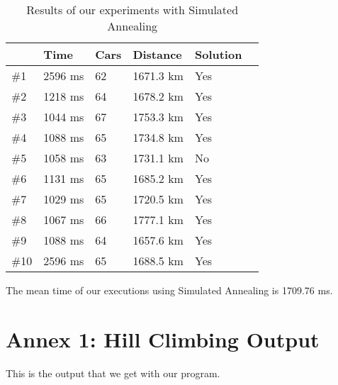 \documentclass[12]{article}
\begin{document}
\begin{table}[h]
\centering
\begin{tabular}{|l|l|l|l|l|l|}
\hline & \textbf{Time}  & \textbf{Cars} & \textbf{Distance} & \textbf{Solution}\\  \hline
 \#1 & 2596 ms  & 62 & 1671.3 km & Yes \\ \hline
 \#2 & 1218 ms & 64 & 1678.2 km & Yes \\ \hline
  \#3 & 1044 ms & 67 & 1753.3 km & Yes \\ \hline
 \#4 & 1088 ms & 65 & 1734.8 km & Yes \\ \hline
 \#5 & 1058 ms & 63 & 1731.1 km & No \\ \hline
 \#6 & 1131 ms & 65 & 1685.2 km & Yes \\ \hline
 \#7 & 1029 ms & 65 & 1720.5 km & Yes \\ \hline
 \#8 & 1067 ms & 66 & 1777.1 km & Yes \\ \hline
 \#9 & 1088 ms & 64 & 1657.6 km & Yes\\ \hline
 \#10 & 2596 ms & 65 & 1688.5 km & Yes \\ \hline

\end{tabular}
\caption{Results of our experiments with Simulated Annealing}
\label{Results2}
\end{table}

The mean time of our executions using Simulated Annealing is 1709.76 ms. 

\section{Annex 1: Hill Climbing Output}
This is the output that we get with our program.
\end{document}
